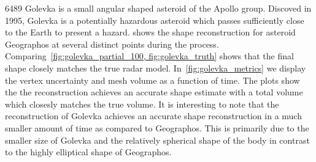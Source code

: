 \num{6489} Golevka is a small angular shaped asteroid of the Apollo group.
Discoved in \num{1995}, Golevka is a potentially hazardous asteroid which passes sufficiently close to the Earth to present a hazard.
 shows the shape reconstruction for asteroid Geographos at several distinct points during the process.
Comparing~\cref{fig:golevka_partial_100, fig:golevka_truth} shows that the final shape closely matches the true radar model.
In~\cref{fig:golevka_metrics} we display the vertex uncertainty and mesh volume as a function of time.
The plots show the the reconstruction achieves an accurate shape estimate with a total volume which closesly matches the true volume.
It is interesting to note that the reconstruction of Golevka achieves an accurate shape reconstruction in a much smaller amount of time as compared to Geographos.
This is primarily due to the smaller size of Golevka and the relatively spherical shape of the body in contrast to the highly elliptical shape of Geographos.

